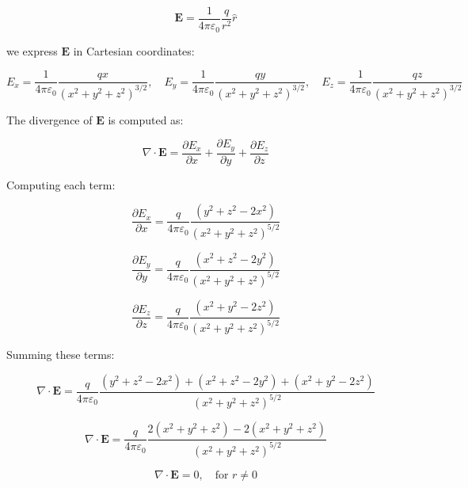 \documentclass[a4paper,12pt]{article}
\begin{document}
\begin{equation}
\mathbf{E} = \frac{1}{4\pi\varepsilon_0} \frac{q}{r^2} \hat{r}
\end{equation}

we express \( \mathbf{E} \) in Cartesian coordinates:

\begin{equation}
E_x = \frac{1}{4\pi\varepsilon_0} \frac{q x}{(x^2 + y^2 + z^2)^{3/2}}, \quad
E_y = \frac{1}{4\pi\varepsilon_0} \frac{q y}{(x^2 + y^2 + z^2)^{3/2}}, \quad
E_z = \frac{1}{4\pi\varepsilon_0} \frac{q z}{(x^2 + y^2 + z^2)^{3/2}}
\end{equation}

The divergence of \( \mathbf{E} \) is computed as:

\begin{equation}
\nabla \cdot \mathbf{E} = \frac{\partial E_x}{\partial x} + \frac{\partial E_y}{\partial y} + \frac{\partial E_z}{\partial z}
\end{equation}

Computing each term:

\begin{equation}
\frac{\partial E_x}{\partial x} = \frac{q}{4\pi\varepsilon_0} \frac{(y^2 + z^2 - 2x^2)}{(x^2 + y^2 + z^2)^{5/2}}
\end{equation}

\begin{equation}
\frac{\partial E_y}{\partial y} = \frac{q}{4\pi\varepsilon_0} \frac{(x^2 + z^2 - 2y^2)}{(x^2 + y^2 + z^2)^{5/2}}
\end{equation}

\begin{equation}
\frac{\partial E_z}{\partial z} = \frac{q}{4\pi\varepsilon_0} \frac{(x^2 + y^2 - 2z^2)}{(x^2 + y^2 + z^2)^{5/2}}
\end{equation}

Summing these terms:

\begin{equation}
\nabla \cdot \mathbf{E} = \frac{q}{4\pi\varepsilon_0} \frac{(y^2 + z^2 - 2x^2) + (x^2 + z^2 - 2y^2) + (x^2 + y^2 - 2z^2)}{(x^2 + y^2 + z^2)^{5/2}}
\end{equation}

\begin{equation}
\nabla \cdot \mathbf{E} = \frac{q}{4\pi\varepsilon_0} \frac{2(x^2 + y^2 + z^2) - 2(x^2 + y^2 + z^2)}{(x^2 + y^2 + z^2)^{5/2}}
\end{equation}

\begin{equation}
\boxed{\nabla \cdot \mathbf{E} = 0, \quad \text{for } r \neq 0}
\end{equation}
\end{document}
